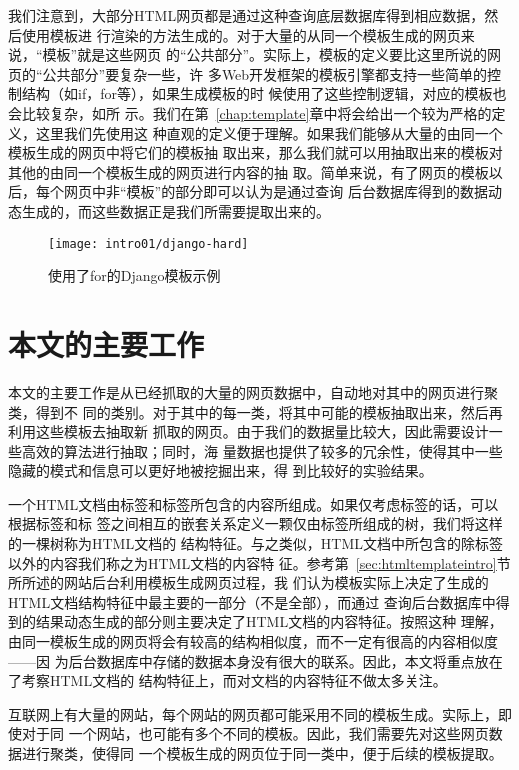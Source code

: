 我们注意到，大部分HTML网页都是通过这种查询底层数据库得到相应数据，然后使用模板进
行渲染的方法生成的。对于大量的从同一个模板生成的网页来说，“模板”就是这些网页
的“公共部分”。实际上，模板的定义要比这里所说的网页的“公共部分”要复杂一些，许
多Web开发框架的模板引擎都支持一些简单的控制结构（如if，for等），如果生成模板的时
候使用了这些控制逻辑，对应的模板也会比较复杂，如所
示。我们在第~\ref{chap:template}章中将会给出一个较为严格的定义，这里我们先使用这
种直观的定义便于理解。如果我们能够从大量的由同一个模板生成的网页中将它们的模板抽
取出来，那么我们就可以用抽取出来的模板对其他的由同一个模板生成的网页进行内容的抽
取。简单来说，有了网页的模板以后，每个网页中非“模板”的部分即可以认为是通过查询
后台数据库得到的数据动态生成的，而这些数据正是我们所需要提取出来的。
\begin{figure}
  \centering
  \texttt{[image: intro01/django-hard]}
  \caption{使用了for的Django模板示例}
  \label{intro:fig:django-hard}
\end{figure}
\section{本文的主要工作}
\label{sec:mainwork}
本文的主要工作是从已经抓取的大量的网页数据中，自动地对其中的网页进行聚类，得到不
同的类别。对于其中的每一类，将其中可能的模板抽取出来，然后再利用这些模板去抽取新
抓取的网页。由于我们的数据量比较大，因此需要设计一些高效的算法进行抽取；同时，海
量数据也提供了较多的冗余性，使得其中一些隐藏的模式和信息可以更好地被挖掘出来，得
到比较好的实验结果。

一个HTML文档由标签和标签所包含的内容所组成。如果仅考虑标签的话，可以根据标签和标
签之间相互的嵌套关系定义一颗仅由标签所组成的树，我们将这样的一棵树称为HTML文档的
结构特征。与之类似，HTML文档中所包含的除标签以外的内容我们称之为HTML文档的内容特
征。参考第~\ref{sec:htmltemplateintro}节所所述的网站后台利用模板生成网页过程，我
们认为模板实际上决定了生成的HTML文档结构特征中最主要的一部分（不是全部），而通过
查询后台数据库中得到的结果动态生成的部分则主要决定了HTML文档的内容特征。按照这种
理解，由同一模板生成的网页将会有较高的结构相似度，而不一定有很高的内容相似度——因
为后台数据库中存储的数据本身没有很大的联系。因此，本文将重点放在了考察HTML文档的
结构特征上，而对文档的内容特征不做太多关注。

互联网上有大量的网站，每个网站的网页都可能采用不同的模板生成。实际上，即使对于同
一个网站，也可能有多个不同的模板。因此，我们需要先对这些网页数据进行聚类，使得同
一个模板生成的网页位于同一类中，便于后续的模板提取。


